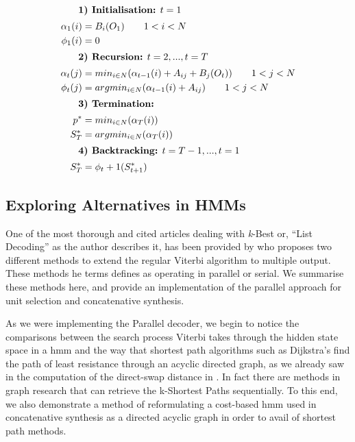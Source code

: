 {{{{{{{\setlength{\parindent}{1cm}

\indent
{
\begin{align}
\intertext{ \indent \textbf{1) Initialisation:} $t=1$}
			\alpha_1(i) &= B_{i}(O_1)\qquad1<i<N \nonumber \\
			\phi_1(i) &= 0 \label{eq:concat_start} \\
\intertext{ \indent \textbf{2) Recursion:} $t=2,...,t=T$}
			\alpha_t(j) &= min_{i\in N}(\alpha_{t-1}(i)+A_{ij}+B_{j}(O_{t}))\qquad1<j<N \nonumber \\
			\phi_t(j) &= argmin_{i\in N}(\alpha_{t-1}(i)+A_{ij})\qquad1<j<N\\
\intertext{ \indent \textbf{3) Termination:}}
			p^* &= min_{i \in N}(\alpha_T(i)) \nonumber \\
			S^*_{T} &= argmin_{i \in N}(\alpha_T(i))\\
\intertext{ \indent \textbf{4) Backtracking:} $t=T-1,...,t=1$}
			S^*_{T} &= \phi_t+1(S^*_{t+1}) \label{eq:concat_end}
\end{align}
}

\normalsize

\subsection{Exploring Alternatives in HMMs}

One of the most thorough and cited articles dealing with \textit{k}-Best or, ``List Decoding'' as the author describes it, has been provided by \citep{Seshadri1994} who proposes two different methods to extend the regular Viterbi algorithm to multiple output. These methods he terms defines as operating in parallel or serial. We summarise these methods here, and provide an implementation of the parallel approach for unit selection and concatenative synthesis.

As we were implementing the Parallel decoder, we begin to notice the comparisons between the search process Viterbi takes through the hidden state space in a \acrshort{hmm} and the way that shortest path algorithms such as Dijkstra's find the path of least resistance through an acyclic directed graph, as we already saw in the computation of the direct-swap distance in . In fact there are methods in graph research that can retrieve the k-Shortest Paths sequentially. To this end, we also demonstrate a method of reformulating a cost-based \acrshort{hmm} used in concatenative synthesis as a directed acyclic graph in order to avail of shortest path methods.

}}}}}}}
